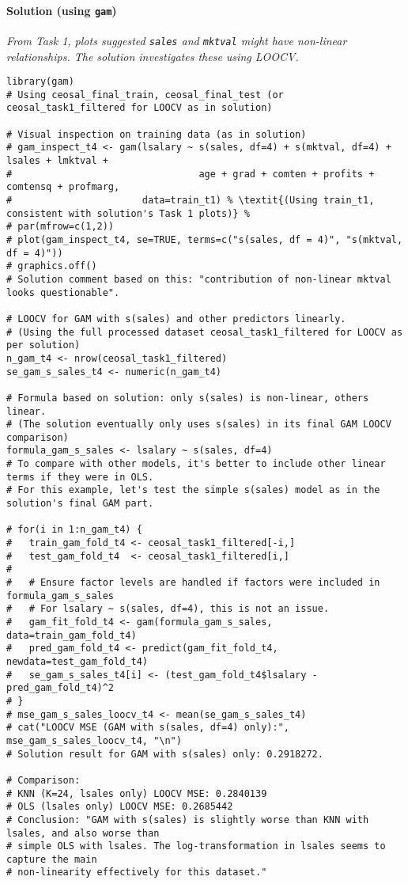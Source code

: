 \documentclass[12pt,a4paper]{article}
\newcommand{\Rpackage}[1]{\texttt{#1}} %
\newcommand{\Rcode}[1]{\texttt{#1}} %
\begin{document}
        \paragraph{Solution (using \Rpackage{gam})}
            \textit{From Task 1, plots suggested \Rcode{sales} and \Rcode{mktval} might have non-linear relationships. The solution investigates these using LOOCV.}
\begin{lstlisting}[caption={GAM for lsalary (Task 4)}]
library(gam)
# Using ceosal_final_train, ceosal_final_test (or ceosal_task1_filtered for LOOCV as in solution)

# Visual inspection on training data (as in solution)
# gam_inspect_t4 <- gam(lsalary ~ s(sales, df=4) + s(mktval, df=4) + lsales + lmktval + 
#                                 age + grad + comten + profits + comtensq + profmarg, 
#                       data=train_t1) % \textit{(Using train_t1, consistent with solution's Task 1 plots)} %
# par(mfrow=c(1,2))
# plot(gam_inspect_t4, se=TRUE, terms=c("s(sales, df = 4)", "s(mktval, df = 4)"))
# graphics.off()
# Solution comment based on this: "contribution of non-linear mktval looks questionable".

# LOOCV for GAM with s(sales) and other predictors linearly.
# (Using the full processed dataset ceosal_task1_filtered for LOOCV as per solution)
n_gam_t4 <- nrow(ceosal_task1_filtered)
se_gam_s_sales_t4 <- numeric(n_gam_t4)

# Formula based on solution: only s(sales) is non-linear, others linear.
# (The solution eventually only uses s(sales) in its final GAM LOOCV comparison)
formula_gam_s_sales <- lsalary ~ s(sales, df=4) 
# To compare with other models, it's better to include other linear terms if they were in OLS.
# For this example, let's test the simple s(sales) model as in the solution's final GAM part.

# for(i in 1:n_gam_t4) {
#   train_gam_fold_t4 <- ceosal_task1_filtered[-i,]
#   test_gam_fold_t4  <- ceosal_task1_filtered[i,]
#   
#   # Ensure factor levels are handled if factors were included in formula_gam_s_sales
#   # For lsalary ~ s(sales, df=4), this is not an issue.
#   gam_fit_fold_t4 <- gam(formula_gam_s_sales, data=train_gam_fold_t4)
#   pred_gam_fold_t4 <- predict(gam_fit_fold_t4, newdata=test_gam_fold_t4)
#   se_gam_s_sales_t4[i] <- (test_gam_fold_t4$lsalary - pred_gam_fold_t4)^2
# }
# mse_gam_s_sales_loocv_t4 <- mean(se_gam_s_sales_t4)
# cat("LOOCV MSE (GAM with s(sales, df=4) only):", mse_gam_s_sales_loocv_t4, "\n")
# Solution result for GAM with s(sales) only: 0.2918272.

# Comparison:
# KNN (K=24, lsales only) LOOCV MSE: 0.2840139
# OLS (lsales only) LOOCV MSE: 0.2685442
# Conclusion: "GAM with s(sales) is slightly worse than KNN with lsales, and also worse than
# simple OLS with lsales. The log-transformation in lsales seems to capture the main
# non-linearity effectively for this dataset."
\end{lstlisting}
\end{document}
